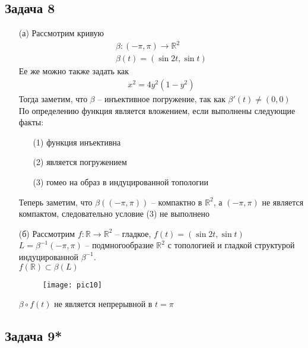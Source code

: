 \subsection*{Задача 8}
\begin{enumerate}
\item[(а)]
	Рассмотрим кривую 
	\begin{gather*}
		\beta: (-\pi, \pi) \to \mathbb{R}^2\\
		\beta(t) = (\sin 2t, \sin t)
	\end{gather*}
	Ее же можно также задать как
	\begin{gather*}
		x^2 = 4y^2(1-y^2)
	\end{gather*}
	Тогда заметим, что $\beta$ -- инъективное погружение, так как $\beta'(t) \ne (0,0)$\\
	По определению функция является вложением, если выполнены следующие факты:
	\begin{enumerate}
	\item[(1)] функция инъективна
	\item[(2)] является погружением
	\item[(3)] гомео на образ в индуцированной топологии
	\end{enumerate}
	Теперь заметим, что $\beta((-\pi, \pi))$ -- компактно в $\mathbb{R}^2$, а $(-\pi, \pi)$ не является компактом, следовательно условие (3) не выполнено
	
\item[(б)]
	Рассмотрим $f: \mathbb{R} \to \mathbb{R}^2$ -- гладкое, $f(t) = (\sin 2t, \sin t)$\\
	$L = \beta^{-1}(-\pi,\pi)$ -- подмногообразие $\mathbb{R}^2$ с топологией и гладкой структурой индуцированной $\beta^{-1}$.\\
	$f(\mathbb{R}) \subset \beta(L)$
	\begin{figure}[!h]
		\texttt{[image: pic10]}
	\end{figure}
	$\beta \circ f(t)$ не является непрерывной в $t = \pi$
\end{enumerate}



\subsection*{Задача 9*}



